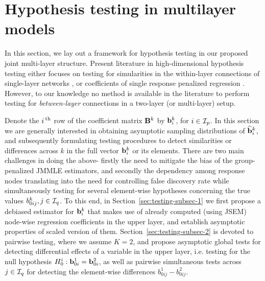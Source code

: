 \section{Hypothesis testing in multilayer models}
\label{sec:sec3}
In this section, we lay out a framework for hypothesis testing in our proposed joint multi-layer structure. Present literature in high-dimensional hypothesis testing either focuses on testing for simularities in the within-layer connections of single-layer networks \citep{CaiLiu16,Liu17}, or coefficients of single response penalized regression \citep{vanDeGeerEtal14,ZhangZhang14,MitraZhang16}. However, to our knowledge no method is available in the literature to perform testing for {\it between-layer} connections in a two-layer (or multi-layer) setup.

Denote the $i\operatorname*{^{\text{th}}}$ row of the coefficient matrix ${\mathbf{B}}^k$ by ${\bf{b}}_i^k$, for $i \in {\cal{I}}_p$. In this section we are generally interested in obtaining asymptotic sampling distributions of $\widehat {{\bf{b}}}_i^k$, and subsequently formulating testing procedures to detect similarities or differences across $k$ in the full vector ${\bf{b}}_i^k$ or its elements. There are two main challenges in doing the above- firstly the need to mitigate the bias of the group-penalized JMMLE estimators, and secondly the dependency among response nodes translating into the need for controlling false discovery rate while simultaneously testing for several element-wise hypotheses concerning the true values $b_{0 ij}^k, j \in {\cal{I}}_q$. To this end, in Section~\ref{sec:testing-subsec-1} we first propose a debiased estimator for ${\bf{b}}_i^k$ that makes use of already computed (using JSEM) node-wise regression coefficients in the upper layer, and establish asymptotic properties of scaled version of them. Section~\ref{sec:testing-subsec-2} is devoted to pairwise testing, where we assume $K=2$, and propose asymptotic global tests for detecting differential effects of a variable in the upper layer, i.e. testing for the null hypothesis $H_0^i: {\bf{b}}_{0 i}^1 = {\bf{b}}_{0 i}^2$, as well as pairwise simultaneous tests across $j \in {\cal{I}}_q$ for detecting the element-wise differences $b_{0 ij}^1 - b_{0 ij}^2$.


